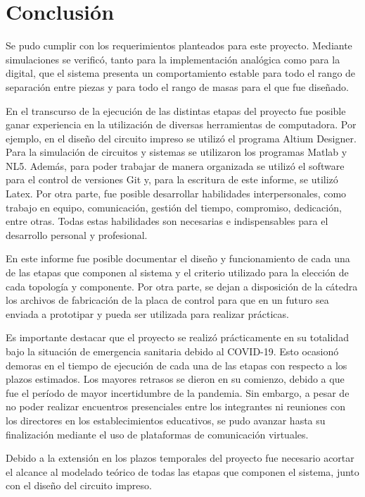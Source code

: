 \chapter{Conclusión}  \label{cap:Conclusión}

Se pudo cumplir con los requerimientos planteados para este proyecto. Mediante simulaciones se verificó, tanto para la implementación analógica como para la digital, que el sistema presenta un comportamiento estable para todo el rango de separación entre piezas y para todo el rango de masas para el que fue diseñado. 

En el transcurso de la ejecución de las distintas etapas del proyecto fue posible ganar experiencia en la utilización de diversas herramientas de computadora. Por ejemplo, en el diseño del circuito impreso se utilizó el programa Altium Designer. Para la simulación de circuitos y sistemas se utilizaron los programas Matlab y NL5. Además, para poder trabajar de manera organizada se utilizó el software para el control de versiones Git y, para la escritura de este informe, se utilizó Latex. Por otra parte, fue posible desarrollar habilidades interpersonales, como trabajo en equipo, comunicación, gestión del tiempo, compromiso, dedicación, entre otras. Todas estas habilidades son necesarias e indispensables para el desarrollo personal y profesional.

En este informe fue posible documentar el diseño y funcionamiento de cada una de las etapas que componen al sistema y el criterio utilizado para la elección de cada topología y componente. Por otra parte, se dejan a disposición de la cátedra  los archivos de fabricación de la placa de control para que en un futuro sea enviada a prototipar y pueda ser utilizada para realizar prácticas.

Es importante destacar que el proyecto se realizó prácticamente en su totalidad bajo la situación de emergencia sanitaria debido al COVID-19. Esto ocasionó demoras en el tiempo de ejecución de cada una de las etapas con respecto a los plazos estimados. Los mayores retrasos se dieron en su comienzo, debido a que fue el período de mayor incertidumbre de la pandemia. Sin embargo, a pesar de no poder realizar encuentros presenciales entre los integrantes ni reuniones con los directores en los establecimientos educativos, se pudo avanzar hasta su finalización  mediante el uso de plataformas de comunicación virtuales.

Debido a la extensión en los plazos temporales del proyecto fue necesario acortar el alcance al modelado teórico de todas las etapas que componen el sistema, junto con el diseño del circuito impreso.

